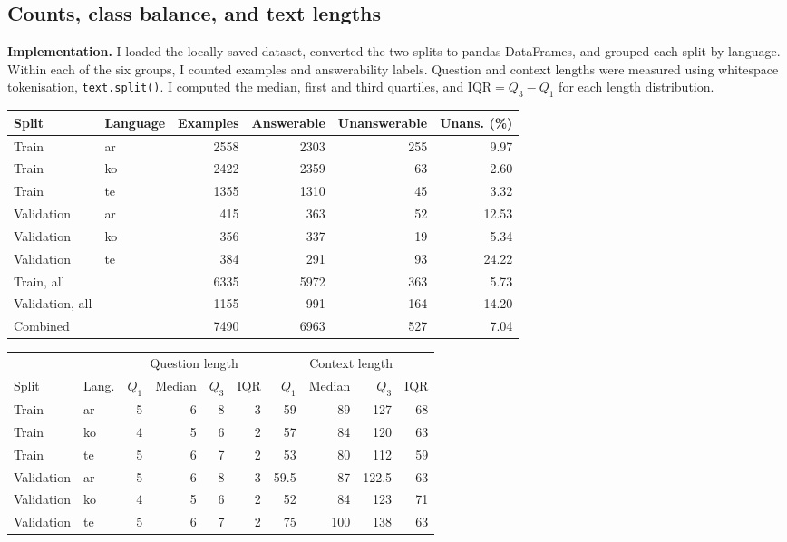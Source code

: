 \documentclass[11pt,a4paper]{article}
\begin{document}
\subsection{Counts, class balance, and text lengths}
\textbf{Implementation.} I loaded the locally saved dataset, converted the two splits to pandas DataFrames, and grouped each split by language. Within each of the six groups, I counted examples and answerability labels. Question and context lengths were measured using whitespace tokenisation, \texttt{text.split()}. I computed the median, first and third quartiles, and $\mathrm{IQR}=Q_3-Q_1$ for each length distribution.

\begin{center}
\small
\begin{tabular}{llrrrr}
\toprule
Split & Language & Examples & Answerable & Unanswerable & Unans. (\%) \\
\midrule
Train & ar & 2558 & 2303 & 255 & 9.97 \\
Train & ko & 2422 & 2359 & 63 & 2.60 \\
Train & te & 1355 & 1310 & 45 & 3.32 \\
Validation & ar & 415 & 363 & 52 & 12.53 \\
Validation & ko & 356 & 337 & 19 & 5.34 \\
Validation & te & 384 & 291 & 93 & 24.22 \\
\midrule
Train, all & & 6335 & 5972 & 363 & 5.73 \\
Validation, all & & 1155 & 991 & 164 & 14.20 \\
Combined & & 7490 & 6963 & 527 & 7.04 \\
\bottomrule
\end{tabular}
\end{center}

\begin{center}
\small
\begin{tabular}{llrrrrrrrr}
\toprule
& & \multicolumn{4}{c}{Question length} & \multicolumn{4}{c}{Context length} \\
\cmidrule(lr){3-6}\cmidrule(lr){7-10}
Split & Lang. & $Q_1$ & Median & $Q_3$ & IQR & $Q_1$ & Median & $Q_3$ & IQR \\
\midrule
Train & ar & 5 & 6 & 8 & 3 & 59 & 89 & 127 & 68 \\
Train & ko & 4 & 5 & 6 & 2 & 57 & 84 & 120 & 63 \\
Train & te & 5 & 6 & 7 & 2 & 53 & 80 & 112 & 59 \\
Validation & ar & 5 & 6 & 8 & 3 & 59.5 & 87 & 122.5 & 63 \\
Validation & ko & 4 & 5 & 6 & 2 & 52 & 84 & 123 & 71 \\
Validation & te & 5 & 6 & 7 & 2 & 75 & 100 & 138 & 63 \\
\bottomrule
\end{tabular}
\end{center}
\end{document}
